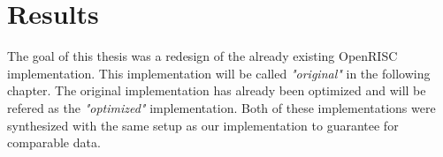 
\chapter{Results}
The goal of this thesis was a redesign of the already existing OpenRISC implementation\cite{website:OpenCores}. This implementation will be called \textit{"original"} in the following chapter. The original implementation has already been optimized and will be refered as the \textit{"optimized"} implementation. Both of these implementations were synthesized with the same setup as our implementation to guarantee for comparable data.
